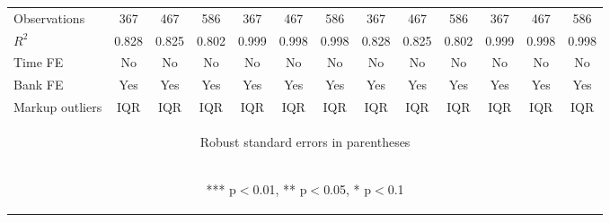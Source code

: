 \documentclass[]{article}
\begin{document}
\begin{center}
\begin{tabular}{lcccccccccccc}
Observations & 367 & 467 & 586 & 367 & 467 & 586 & 367 & 467 & 586 & 367 & 467 & 586 \\
$R^2$ & 0.828 & 0.825 & 0.802 & 0.999 & 0.998 & 0.998 & 0.828 & 0.825 & 0.802 & 0.999 & 0.998 & 0.998 \\
Time FE & No & No & No & No & No & No & No & No & No & No & No & No \\
Bank FE & Yes & Yes & Yes & Yes & Yes & Yes & Yes & Yes & Yes & Yes & Yes & Yes \\
 Markup outliers & IQR & IQR & IQR & IQR & IQR & IQR & IQR & IQR & IQR & IQR & IQR & IQR \\ \hline
\multicolumn{13}{c}{\begin{footnotesize} Robust standard errors in parentheses\end{footnotesize}} \\
\multicolumn{13}{c}{\begin{footnotesize} *** p$<$0.01, ** p$<$0.05, * p$<$0.1\end{footnotesize}} \\
\end{tabular}
\end{center}
\end{document}
